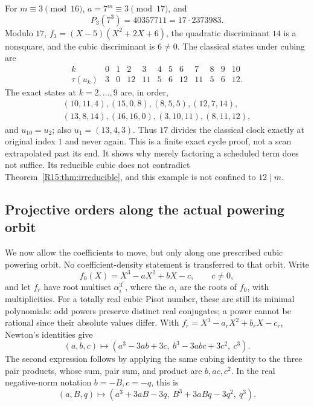 \documentclass[11pt,a4paper]{article}
\theoremstyle{definition}\newtheorem{definition}[theorem]{Definition}
\theoremstyle{remark}\newtheorem{remark}[theorem]{Remark}
\begin{document}
For $m\equiv3\pmod{16}$, $a=7^m\equiv3\pmod{17}$, and
\[
 P_3(7^3)=40357711=17\cdot2373983.
\]
Modulo $17$,
$f_3=(X-5)(X^2+2X+6)$, the quadratic discriminant $14$ is a
nonsquare, and the cubic discriminant is $6\ne0$.
The classical states under cubing are
\[
\begin{array}{r|rrrrrrrrrrr}
k&0&1&2&3&4&5&6&7&8&9&10\\\hline
\tau(u_k)&3&0&12&11&5&6&12&11&5&6&12.
\end{array}
\]
The exact states at $k=2,\ldots,9$ are, in order,
\[
\begin{gathered}
(10,11,4),(15,0,8),(8,5,5),(12,7,14),\\
(13,8,14),(16,16,0),(3,10,11),(8,11,12),
\end{gathered}
\]
and $u_{10}=u_2$; also $u_1=(13,4,3)$.
Thus $17$ divides the classical clock exactly at original index $1$
and never again. This is a finite exact cycle proof, not a scan
extrapolated past its end. It shows why merely factoring a scheduled
term does not suffice. Its reducible cubic does not contradict
Theorem~\ref{R15:thm:irreducible}, and this example is not confined to
$12\mid m$.

\subsection{Projective orders along the actual powering orbit}

We now allow the coefficients to move, but only along one prescribed
cubic powering orbit. No coefficient-density statement is transferred
to that orbit. Write
\[
 f_0(X)=X^3-aX^2+bX-c,\qquad c\ne0,
\]
and let $f_r$ have root multiset $\alpha_i^{3^r}$, where the
$\alpha_i$ are the roots of $f_0$, with multiplicities. For a totally
real cubic Pisot number, these are still its minimal polynomials:
odd powers preserve distinct real conjugates; a power cannot be
rational since their absolute values differ.
With $f_r=X^3-a_rX^2+b_rX-c_r$, Newton's identities give
\begin{equation}\label{R15:eq:cubemap}
 (a,b,c)\longmapsto
 (a^3-3ab+3c,\ b^3-3abc+3c^2,\ c^3).
\end{equation}
The second expression follows by applying the same cubing identity
to the three pair products, whose sum, pair sum, and product are
$b,ac,c^2$. In the real negative-norm notation $b=-B,c=-q$, this is
\begin{equation}\label{R15:eq:negative-map}
 (a,B,q)\longmapsto
 (a^3+3aB-3q,\ B^3+3aBq-3q^2,\ q^3).
\end{equation}
\end{document}
